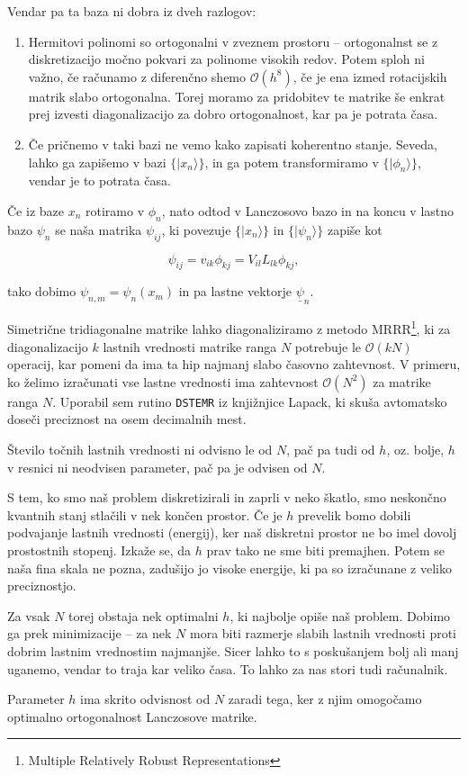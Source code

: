 \documentclass[a4 paper, 12pt]{article}
\begin{document}
Vendar pa ta baza ni dobra iz dveh razlogov:
\begin{enumerate}
	\item{Hermitovi polinomi so ortogonalni v zveznem prostoru -- ortogonalnst se z diskretizacijo močno pokvari za polinome
		visokih redov. Potem sploh ni važno, če računamo z diferenčno shemo $\mathcal{O}(h^8)$, če je ena izmed rotacijskih
		matrik slabo ortogonalna. Torej moramo za pridobitev te matrike še enkrat prej izvesti diagonalizacijo za dobro
		ortogonalnost, kar pa je potrata časa.}
	\item{Če pričnemo v taki bazi ne vemo kako zapisati koherentno stanje. Seveda, lahko ga zapišemo v bazi $\big\{|x_n\rangle\big\}$,
		in ga potem transformiramo v $\big\{|\phi_n\rangle\big\}$, vendar je to potrata časa.}
\end{enumerate}

Če iz baze $x_n$ rotiramo v $\phi_n$, nato odtod v Lanczosovo bazo in na koncu v lastno bazo $\psi_n$ se naša matrika $\psi_{ij}$, ki
povezuje $\big\{|x_n\rangle\big\}$ in $\big\{|\psi_n\rangle\big\}$ zapiše kot

\[
	\psi_{ij} = v_{ik} \phi_{kj} = V_{il} L_{lk} \phi_{kj},
\]

tako dobimo $\psi_{n,m} = \psi_n (x_m)$ in pa lastne vektorje $\underline{\psi}_n$.

Simetrične tridiagonalne matrike lahko diagonaliziramo z metodo MRRR\footnote{Multiple Relatively Robust Representations}, ki za
diagonalizacijo $k$ lastnih vrednosti matrike ranga $N$ potrebuje le $\mathcal{O} (kN)$ operacij, kar pomeni da ima ta hip
najmanj slabo časovno zahtevnost. V primeru, ko želimo izračunati vse lastne vrednosti ima zahtevnost $\mathcal{O}(N^2)$ za
matrike ranga $N$. Uporabil sem rutino {\tt DSTEMR} iz knjižnjice {\sc Lapack}, ki skuša avtomatsko doseči preciznost na
osem decimalnih mest.

Število točnih lastnih vrednosti ni odvisno le od $N$, pač pa tudi od $h$, oz. bolje, $h$ v resnici ni neodvisen parameter,
pač pa je odvisen od $N$.

S tem, ko smo naš problem diskretizirali in zaprli v neko škatlo, smo neskončno kvantnih stanj stlačili v nek končen prostor.
Če je $h$ prevelik bomo dobili podvajanje lastnih vrednosti (energij), ker naš diskretni prostor ne bo imel dovolj prostostnih
stopenj. Izkaže se, da $h$ prav tako ne sme biti premajhen. Potem se naša fina skala ne pozna, zadušijo jo visoke energije, ki
pa so izračunane z veliko preciznostjo.

Za vsak $N$ torej obstaja nek optimalni $h$, ki najbolje opiše naš problem. Dobimo ga prek minimizacije -- za nek $N$ mora biti
razmerje slabih lastnih vrednosti proti dobrim lastnim vrednostim najmanjše. Sicer lahko to s poskušanjem bolj ali manj uganemo,
vendar to traja kar veliko časa. To lahko za nas stori tudi računalnik.

Parameter $h$ ima skrito odvisnost od $N$ zaradi tega, ker z njim omogočamo optimalno ortogonalnost Lanczosove matrike.
\end{document}
